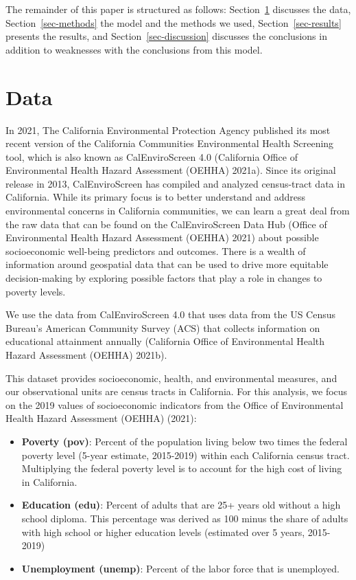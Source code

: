 \documentclass[
  letterpaper,
  DIV=11,
  numbers=noendperiod]{scrartcl}
\begin{document}
The remainder of this paper is structured as follows:
Section~\ref{sec-data} discusses the data, Section~\ref{sec-methods} the
model and the methods we used, Section~\ref{sec-results} presents the
results, and Section~\ref{sec-discussion} discusses the conclusions in
addition to weaknesses with the conclusions from this model.

\section{Data}\label{sec-data}

In 2021, The California Environmental Protection Agency published its
most recent version of the California Communities Environmental Health
Screening tool, which is also known as CalEnviroScreen 4.0 (California
Office of Environmental Health Hazard Assessment (OEHHA) 2021a). Since
its original release in 2013, CalEnviroScreen has compiled and analyzed
census-tract data in California. While its primary focus is to better
understand and address environmental concerns in California communities,
we can learn a great deal from the raw data that can be found on the
CalEnviroScreen Data Hub (Office of Environmental Health Hazard
Assessment (OEHHA) 2021) about possible socioeconomic well-being
predictors and outcomes. There is a wealth of information around
geospatial data that can be used to drive more equitable decision-making
by exploring possible factors that play a role in changes to poverty
levels.

We use the data from CalEnviroScreen 4.0 that uses data from the US
Census Bureau's American Community Survey (ACS) that collects
information on educational attainment annually (California Office of
Environmental Health Hazard Assessment (OEHHA) 2021b).

This dataset provides socioeconomic, health, and environmental measures,
and our observational units are census tracts in California. For this
analysis, we focus on the 2019 values of socioeconomic indicators from
the Office of Environmental Health Hazard Assessment (OEHHA) (2021):

\begin{itemize}
\item
  \textbf{Poverty (pov)}: Percent of the population living below two
  times the federal poverty level (5-year estimate, 2015-2019) within
  each California census tract. Multiplying the federal poverty level is
  to account for the high cost of living in California.
\item
  \textbf{Education (edu)}: Percent of adults that are 25+ years old
  without a high school diploma. This percentage was derived as 100
  minus the share of adults with high school or higher education levels
  (estimated over 5 years, 2015-2019)
\item
  \textbf{Unemployment (unemp)}: Percent of the labor force that is
  unemployed.
\end{itemize}
\end{document}
